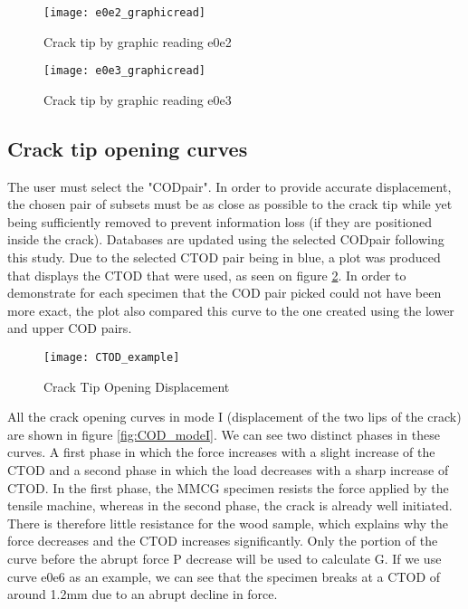 \begin{figure}[htp]
	\begin{minipage}[c]{.46\linewidth}
		\centering
		\texttt{[image: e0e2\_graphicread]}
		\caption{Crack tip by graphic reading e0e2}
		\label{fig:fig39}
	\end{minipage}
	\hfill%
	\begin{minipage}[c]{.46\linewidth}
		\centering
		\texttt{[image: e0e3\_graphicread]}
		\caption{Crack tip by graphic reading e0e3 }
		\label{fig:fig40}
	\end{minipage}
\end{figure}


\subsection{Crack tip opening curves}

The user must select the "CODpair". In order to provide accurate displacement, the chosen pair of subsets must be as close as possible to the crack tip while yet being sufficiently removed to prevent information loss (if they are positioned inside the crack). Databases are updated using the selected CODpair following this study. Due to the selected CTOD pair being in blue, a plot was produced that displays the CTOD that were used, as seen on figure \ref{fig:CTOD_example}. In order to demonstrate for each specimen that the COD pair picked could not have been more exact, the plot also compared this curve to the one created using the lower and upper COD pairs.

\begin{figure}[htp]
	\centering
	\texttt{[image: CTOD\_example]}
	\caption{Crack Tip Opening Displacement}
	\label{fig:CTOD_example}
\end{figure}

All the crack opening curves in mode I (displacement of the two lips of the crack) are shown in figure \ref{fig:COD_modeI}. 
We can see two distinct phases in these curves. A first phase in which the force increases with a slight increase of the CTOD and a second phase in which the load decreases with a sharp increase of CTOD. In the first phase, the MMCG specimen resists the force applied by the tensile machine, whereas in the second phase, the crack is already well initiated. There is therefore little resistance for the wood sample, which explains why the force decreases and the CTOD increases significantly.
Only the portion of the curve before the abrupt force P decrease will be used to calculate G. If we use curve e0e6 as an example, we can see that the specimen breaks at a CTOD of around 1.2mm due to an abrupt decline in force.

